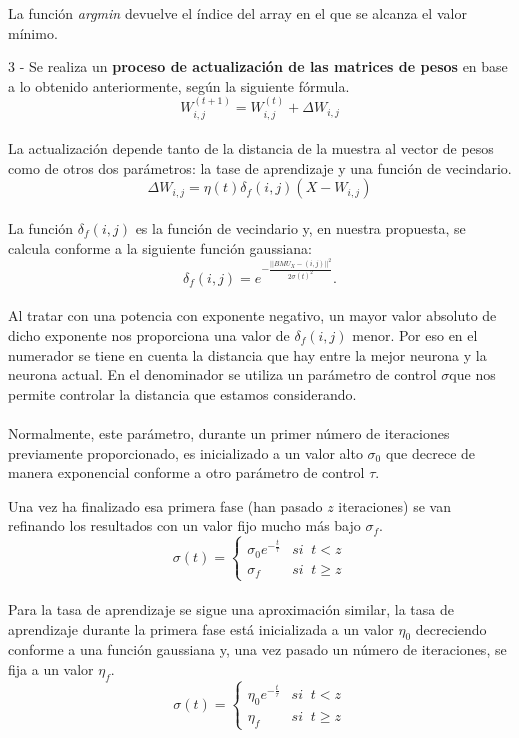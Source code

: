 La función \textit{argmin} devuelve el índice del array en el que se alcanza el valor mínimo.

3 - Se realiza un \textbf{proceso de actualización de las matrices de pesos} en base a lo obtenido anteriormente, según la siguiente fórmula.\\
$$ W_{i, j}^{(t+1)} = W_{i, j}^{(t)} + \Delta {W_{i,j}} $$\\

La actualización depende tanto de la distancia de la muestra al vector de pesos como de otros dos parámetros: la tase de aprendizaje y una función de vecindario.\\

$$\Delta W_{i,j} = \eta(t)\delta_f(i,j)(X-W_{i,j})$$\\

La función $\delta_f(i,j)$ es la función de vecindario y, en nuestra propuesta, se calcula conforme a la siguiente función gaussiana:\\

$$\delta_f(i,j) = e ^{-\frac{||BMU_X-(i,j)||^2}{2\sigma(t)^2}}. $$\\

Al tratar con una potencia con exponente negativo, un mayor valor absoluto de dicho exponente nos proporciona una valor de $\delta_f(i,j)$ menor. Por eso en el numerador se tiene en cuenta la distancia que hay entre la mejor neurona y la neurona actual. En el denominador se utiliza un parámetro de control $\sigma$que nos permite controlar la distancia que estamos considerando.\\\\

Normalmente, este parámetro, durante un primer número de iteraciones previamente proporcionado, es inicializado a un valor alto $\sigma_0$ que decrece de manera exponencial conforme a otro parámetro de control $\tau$.

Una vez ha finalizado esa primera fase (han pasado $z$ iteraciones) se van refinando los resultados con un valor fijo mucho más bajo $\sigma_f$.\\


$$\sigma(t) = \left\{
\begin{array}{ll}
\sigma_0e^{-\frac{t}{\tau}} & si \;\;t < z\\
\sigma_f & si  \;\; t\geq z
\end{array}
\right.
$$\\

Para la tasa de aprendizaje se sigue una aproximación similar, la tasa de aprendizaje durante la primera fase está inicializada a un valor $\eta_0$ decreciendo conforme a una función gaussiana y, una vez pasado un número de iteraciones, se fija a un valor $\eta_f$. \\
$$\sigma(t) = \left\{
\begin{array}{ll}
\eta_0e^{-\frac{t}{\tau}} & si \;\;t < z\\
\eta_f & si  \;\; t\geq z
\end{array}
\right.$$\\

